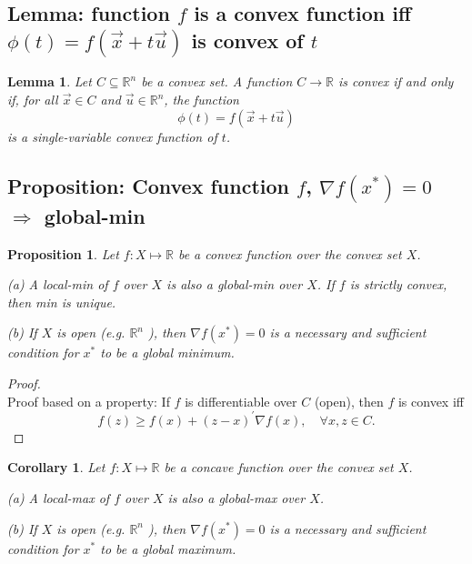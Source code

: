 \documentclass[11pt,a4paper]{article}
\newtheorem{proposition}{Proposition}
\newtheorem{lemma}{Lemma}
\newtheorem{corollary}{Corollary}
\begin{document}
\subsection{Lemma: function $f$ is a convex function iff $\phi(t)=f(\vec{x}+t\vec{u})$ is convex of $t$}
\begin{lemma}
    Let $C\subseteq \mathbb{R}^n$ be a convex set. A function $C \rightarrow \mathbb{R}$ is convex if and only if, for all $\vec{x}\in C$ and $\vec{u}\in \mathbb{R}^n$, the function $$\phi(t)=f(\vec{x}+t\vec{u})$$ is a single-variable convex function of $t$.
\end{lemma}

\subsection{Proposition: Convex function $f$, $\nabla f(x^*)=0$ $\Rightarrow$ global-min}
\begin{proposition}
    Let $f: X \longmapsto \mathbb{R}$ be a convex function over the convex set $X$.

    (a) A local-min of $f$ over $X$ is also a global-min over $X$. If $f$ is strictly convex, then min is unique.

    (b) If $X$ is open (e.g. $\mathbb{R}^{n}$ ), then $\nabla f\left(x^{*}\right)=0$ is a necessary and sufficient condition for $x^{*}$ to be a global minimum.
\end{proposition}
\begin{proof}
\quad\\
Proof based on a property: If $f$ is differentiable over $C$ (open), then $f$ is convex iff
$$
f(z) \geq f(x)+(z-x)^{\prime} \nabla f(x), \quad \forall x, z \in C .
$$
\end{proof}


\begin{corollary}
    Let $f: X \longmapsto \mathbb{R}$ be a concave function over the convex set $X$.

    (a) A local-max of $f$ over $X$ is also a global-max over $X$.

    (b) If $X$ is open (e.g. $\mathbb{R}^{n}$ ), then $\nabla f\left(x^{*}\right)=0$ is a necessary and sufficient condition for $x^{*}$ to be a global maximum.
\end{corollary}
\end{document}

